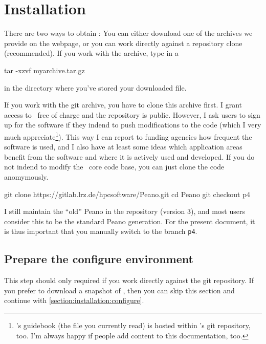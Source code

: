 \chapter{Installation}

There are two ways to obtain \Peano: 
You can either download one of the archives we provide on the webpage, or you
can work directly against a repository clone (recommended).
If you work with the archive, type in a 
\begin{code}
tar -xzvf myarchive.tar.gz
\end{code}
in the directory where you've stored your downloaded file.


If you work with the git archive, you have to clone this archive first. 
I grant access to \Peano\  free of charge and the repository is public.
However, I ask users to sign up for the software if they indend to push
modifications to the code (which I very much appreciate\footnote{\Peano's
guidebook (the file you currently read) is hosted within \Peano's git
repository, too. I'm always happy if people add content to this
documentation, too.}).
This way I can report to funding agencies how frequent the software is used, and
I also have at least some ideas which application areas benefit from the
software and where it is actively used and developed.
If you do not indend to modify the \Peano\ core code base, you can just clone
the code anomymously.

\begin{code}
git clone https://gitlab.lrz.de/hpcsoftware/Peano.git
cd Peano
git checkout p4
\end{code}


\begin{remark}
I still maintain the ``old'' Peano in the repository (version 3), and most users
consider this to be the standard Peano generation.
For the present document, it is thus important that you manually switch to the
branch \texttt{p4}.
\end{remark}



\section{Prepare the configure environment}

This step should only required if you work directly against the git repository.
If you prefer to download a snapshot of \Peano, then you can skip this section
and continue with \ref{section:installation:configure}.


